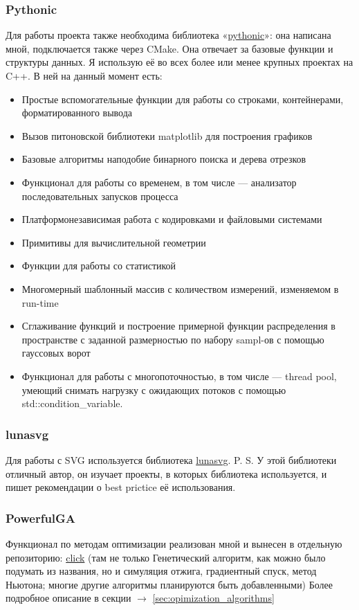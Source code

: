 \documentclass[11pt]{article}
\begin{document}
    \subsubsection{Pythonic}
    Для работы проекта также необходима библиотека «\href{https://github.com/donRumata03/pythonic}{pythonic}»: она написана мной, подключается также через CMake.
    Она отвечает за базовые функции и структуры данных.
    Я использую её во всех более или менее крупных проектах на C++.
    В ней на данный момент есть:
    \begin{itemize}
        \item Простые вспомогательные функции для работы со строками, контейнерами, форматированного вывода
        \item Вызов питоновской библиотеки matplotlib для построения графиков
        \item Базовые алгоритмы наподобие бинарного поиска и дерева отрезков
        \item Функционал для работы со временем, в том числе — анализатор последовательных запусков процесса
        \item Платформонезависимая работа с кодировками и файловыми системами
        \item Примитивы для вычислительной геометрии
        \item Функции для работы со статистикой
        \item Многомерный шаблонный массив с количеством измерений, изменяемом в run-time
        \item Сглаживание функций и построение примерной функции распределения в пространстве с заданной размерностью по набору sampl-ов с помощью гауссовых ворот
        \item Функционал для работы с многопоточностью, в том числе — thread pool, умеющий снимать нагрузку с ожидающих потоков с помощью std::condition_variable.
    \end{itemize}

    \subsubsection{lunasvg}
    Для работы с SVG используется библиотека \href{https://github.com/sammycage/lunasvg}{lunasvg}.
    P. S. У этой библиотеки отличный автор, он изучает проекты, в которых библиотека используется, и пишет рекомендации о best prictice её использования.

    \subsubsection{PowerfulGA}
    Функционал по методам оптимизации реализован мной и вынесен в отдельную репозиторию: \href{https://github.com/donRumata03/PowerfulGA}{click}
    (там не только Генетический алгоритм, как можно было подумать из названия, но и симуляция отжига, градиентный спуск, метод Ньютона;
    многие другие алгоритмы планируются быть добавленными)
    Более подробное описание в секции $\longrightarrow$ \ref{sec:opimization_algorithms}
\end{document}
